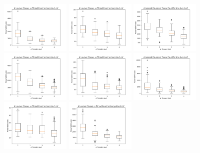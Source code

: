 \documentclass[11pt]{extarticle}
\begin{document}
\noindent
\includegraphics[width=0.25\textwidth]{figures/bmc-ibm-1lnt.png}
\includegraphics[width=0.25\textwidth]{figures/bmc-ibm-2lnt.png}
\includegraphics[width=0.25\textwidth]{figures/bmc-ibm-3lnt.png}
\includegraphics[width=0.25\textwidth]{figures/bmc-ibm-4lnt.png}
\includegraphics[width=0.25\textwidth]{figures/bmc-ibm-5lnt.png}
\includegraphics[width=0.25\textwidth]{figures/bmc-ibm-6lnt.png}
\includegraphics[width=0.25\textwidth]{figures/bmc-ibm-7lnt.png}
\includegraphics[width=0.25\textwidth]{figures/bmc-galileo-8lnt.png}
\end{document}
